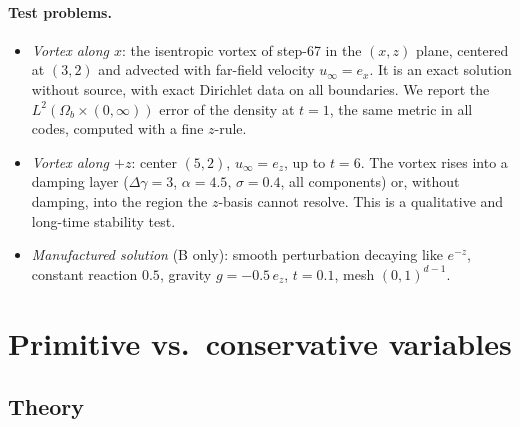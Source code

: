 \documentclass[11pt,a4paper]{article}
\begin{document}
\paragraph{Test problems.}
\begin{itemize}
\item \emph{Vortex along $x$}: the isentropic vortex of step-67 in the $(x,z)$ plane,
  centered at $(3,2)$ and advected with far-field velocity $u_\infty=e_x$. It is an
  exact solution without source, with exact Dirichlet data on all boundaries. We
  report the $L^2(\Omega_b\times(0,\infty))$ error of the density at $t=1$, the same
  metric in all codes, computed with a fine $z$-rule.
\item \emph{Vortex along $+z$}: center $(5,2)$, $u_\infty=e_z$, up to $t=6$. The
  vortex rises into a damping layer ($\Delta\gamma=3$, $\alpha=4.5$, $\sigma=0.4$,
  all components) or, without damping, into the region the $z$-basis cannot
  resolve. This is a qualitative and long-time stability test.
\item \emph{Manufactured solution} (B only): smooth perturbation decaying like
  $e^{-z}$, constant reaction $0.5$, gravity $g=-0.5\,e_z$, $t=0.1$, mesh
  $(0,1)^{d-1}$.
\end{itemize}

\section{Primitive vs.\ conservative variables}

\subsection{Theory}
\end{document}

